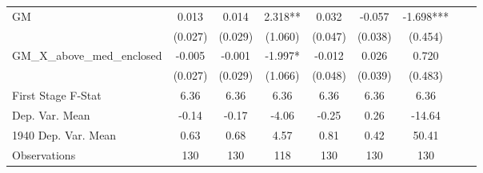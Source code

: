 \begin{tabular}{l*{8}{c}}
\cmidrule(lr){1-7}
GM              &    0.013   &    0.014   &    2.318** &    0.032   &   -0.057   &   -1.698***\\
                &  (0.027)   &  (0.029)   &  (1.060)   &  (0.047)   &  (0.038)   &  (0.454)   \\
\addlinespace
GM\_X\_above\_med\_enclosed&   -0.005   &   -0.001   &   -1.997*  &   -0.012   &    0.026   &    0.720   \\
                &  (0.027)   &  (0.029)   &  (1.066)   &  (0.048)   &  (0.039)   &  (0.483)   \\
\midrule
First Stage F-Stat&     6.36   &     6.36   &     6.36   &     6.36   &     6.36   &     6.36   \\
Dep. Var. Mean  &    -0.14   &    -0.17   &    -4.06   &    -0.25   &     0.26   &   -14.64   \\
1940 Dep. Var. Mean&     0.63   &     0.68   &     4.57   &     0.81   &     0.42   &    50.41   \\
Observations    &      130   &      130   &      118   &      130   &      130   &      130   \\
       \bottomrule \end{tabular}
